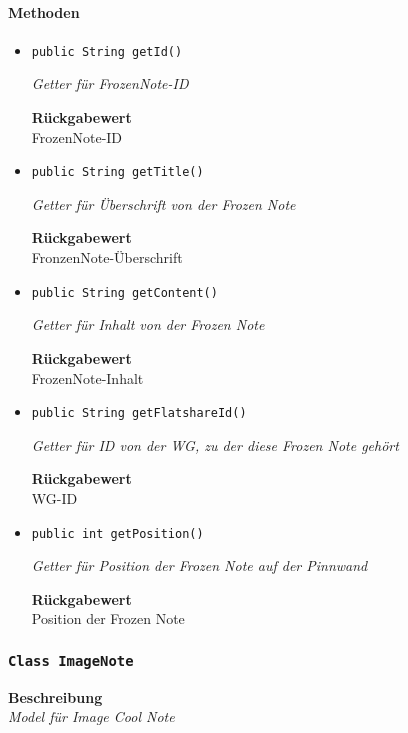      \paragraph*{Methoden}
     \begin{itemize}
     	\item{\texttt{public String getId()}}
     	
     	\textit{Getter für FrozenNote-ID}
     	
     	
     	
     	\textbf{Rückgabewert} \\
     	FrozenNote-ID        \item{\texttt{public String getTitle()}}
     	
     	\textit{Getter für Überschrift von der Frozen Note}
     	
     	
     	
     	\textbf{Rückgabewert} \\
     	FronzenNote-Überschrift        \item{\texttt{public String getContent()}}
     	
     	\textit{Getter für Inhalt von der Frozen Note}
     	
     	
     	
     	\textbf{Rückgabewert} \\
     	FrozenNote-Inhalt        \item{\texttt{public String getFlatshareId()}}
     	
     	\textit{Getter für ID von der WG, zu der diese Frozen Note gehört}
     	
     	
     	
     	\textbf{Rückgabewert} \\
     	WG-ID        \item{\texttt{public int getPosition()}}
     	
     	\textit{Getter für Position der Frozen Note auf der Pinnwand}
     	
     	
     	
     	\textbf{Rückgabewert} \\
     	Position der Frozen Note
     \end{itemize}
     \subsubsection{\texttt{Class ImageNote}}
     \textbf{Beschreibung} \\
     \textit{Model für Image Cool Note}
